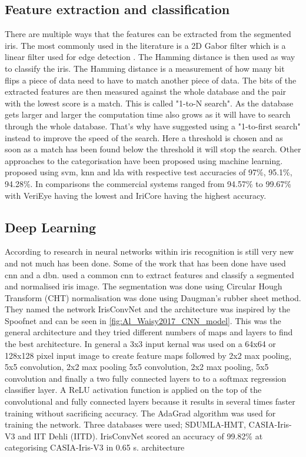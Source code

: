 \subsection{Feature extraction and classification}
There are multiple ways that the features can be extracted from the segmented iris. The most commonly used in the literature is a 2D Gabor filter which is a linear filter used for edge detection \citep{Daugman1993}. The Hamming distance is then used as way to classify the iris. The Hamming distance is a measurement of how many bit flips a piece of data need to have to match another piece of data. The bits of the extracted features are then measured against the whole database and the pair with the lowest score is a match. This is called "1-to-N search". As the database gets larger and larger the computation time also grows as it will have to search through the whole database. That's why \cite{Kuehlkamp2016} have suggested using a "1-to-first search" instead to improve the speed of the search. Here a threshold is chosen and as soon as a match has been found below the threshold it will stop the search. Other approaches to the categorisation have been proposed using machine learning. \cite{Khan2017} proposed using \gls{svm}, \gls{knn} and \gls{lda} with respective test accuracies of 97\%, 95.1\%, 94.28\%. In comparisons the  commercial systems ranged from 94.57\% to  99.67\% with VeriEye having the lowest and IriCore having the highest accuracy. 

\subsection{Deep Learning}
According to \cite{Zhao2017} research in neural networks within iris recognition is still very new and not much has been done. Some of the work that has been done have used \gls{cnn} and a \gls{dbn}. \cite{Al-Waisy2017} used a common \gls{cnn} to extract features and classify a segmented and normalised iris image. The segmentation was done using Circular Hough Transform (CHT) normalisation was done using Daugman's rubber sheet method. They named the network IrisConvNet and the architecture was inspired by the Spoofnet   and can be seen in \autoref{fig:Al_Waisy2017_CNN_model}. This was the general architecture and they tried different numbers of maps and layers to find the best architecture. In general a 3x3 input kernal was used on a 64x64 or 128x128 pixel input image to create feature maps followed by 2x2 max pooling, 5x5 convolution, 2x2 max pooling 5x5 convolution, 2x2 max pooling, 5x5 convolution and finally a two fully connected layers to to a softmax regression classifier layer. A ReLU activation function is applied on the top of the convolutional and fully connected layers because it results in several times faster training without sacrificing accuracy. The AdaGrad algorithm was used for training the network. Three databases were used; SDUMLA-HMT, CASIA-Iris-V3 and IIT Dehli (IITD). IrisConvNet scored an accuracy of 99.82\% at categorising CASIA-Iris-V3 in 0.65 s. architecture 

